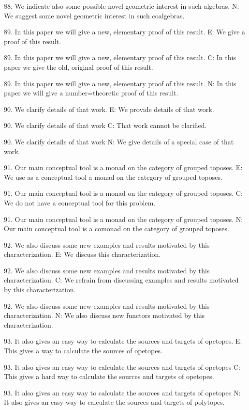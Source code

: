 88. We indicate also some possible novel geometric interest in such algebras.
N: We suggest some novel geometric interest in such coalgebras.

89. In this paper we will give a new, elementary proof of this result.
E: We give a proof of this result.

89. In this paper we will give a new, elementary proof of this result.
C: In this paper we give the old, original proof of this result.

89. In this paper we will give a new, elementary proof of this result.
N: In this paper we will give a number=theoretic proof of this result.

90. We clarify details of that work.
E: We provide details of that work.

90. We clarify details of that work
C: That work cannot be clarified.

90. We clarify details of that work
N: We give details of a special case of that work.

91. Our main conceptual tool is a monad on the category of grouped toposes.
E: We use as a conceptual tool a monad on the category of grouped toposes.

91. Our main conceptual tool is a monad on the category of grouped toposes.
C: We do not have a conceptual tool for this problem.

91. Our main conceptual tool is a monad on the category of grouped toposes.
N: Our main conceptual tool is a comonad on the category of grouped toposes.

92. We also discuss some new examples and results motivated by this characterization.
E: We discuss this characterization.

92. We also discuss some new examples and results motivated by this characterization.
C: We refrain from discussing examples and results motivated by this characterization.

92. We also discuss some new examples and results motivated by this characterization.
N: We also discuss new functors motivated by this characterization.

93. It also gives an easy way to calculate the sources and targets of opetopes.
E: This gives a way to calculate the sources of opetopes.

93. It also gives an easy way to calculate the sources and targets of opetopes
C: This gives a hard way to calculate the sources and targets of opetopes.

93. It also gives an easy way to calculate the sources and targets of opetopes
N: It also gives an easy way to calculate the sources and targets of polytopes.
 
